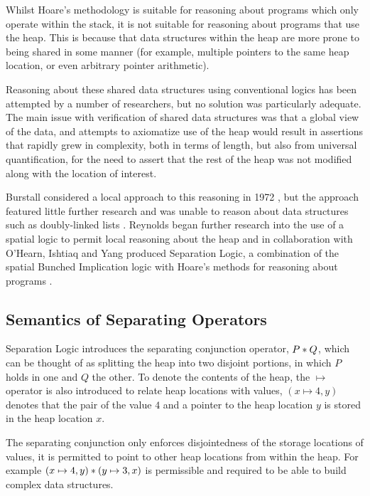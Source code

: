 \documentclass[a4paper,notitlepage]{report}
\begin{document}
  Whilst Hoare's methodology is suitable for reasoning about programs which only
  operate within the stack, it is not suitable for reasoning about programs that
  use the heap. This is because that data structures within the heap are more
  prone to being shared in some manner (for example, multiple pointers to the
  same heap location, or even arbitrary pointer arithmetic).

  Reasoning about these shared data structures using conventional logics has been attempted by a number of
  researchers, but no solution was particularly adequate. The main issue with
  verification of shared data structures was that a global view of the data, and
  attempts to axiomatize use of the heap would result in assertions
  that rapidly grew in complexity, both in terms of length, but also from
  universal quantification, for the need to assert that the rest of the heap was
  not modified along with the location of interest.

  Burstall considered a local approach to this reasoning in 1972
  \cite{burstall1972some}, but the approach featured little further research and
  was unable to reason about data structures such as doubly-linked lists
  \cite{reynolds2000intuitionistic}. Reynolds began further research into the
  use of a spatial logic to permit local reasoning about the heap and in
  collaboration with O'Hearn, Ishtiaq and Yang produced Separation Logic, a
  combination of the spatial Bunched Implication logic with Hoare's methods for
  reasoning about programs
  \cite{Ishtiaq2001BI,OHearn2001Local,reynolds2000intuitionistic,Reynolds2002Separation}.

  \subsection{Semantics of Separating Operators}

  Separation Logic introduces the separating conjunction operator, $P \mathbin{*} Q$,
  which can be thought of as splitting the heap into two disjoint portions, in
  which $P$ holds in one and $Q$ the other. To denote the contents of the
  heap, the $\mapsto$ operator is also introduced to relate heap locations with
  values, $(x \mapsto 4, y)$ denotes that the pair of the value $4$ and a pointer
  to the heap location $y$ is stored in the heap location $x$.

  The separating conjunction only enforces disjointedness of the storage
  locations of values, it is permitted to point to other heap locations from
  within the heap. For example $(x \mapsto 4, y) \mathbin{*} (y \mapsto 3, x)$ is
  permissible and required to be able to build complex data structures.
\end{document}
